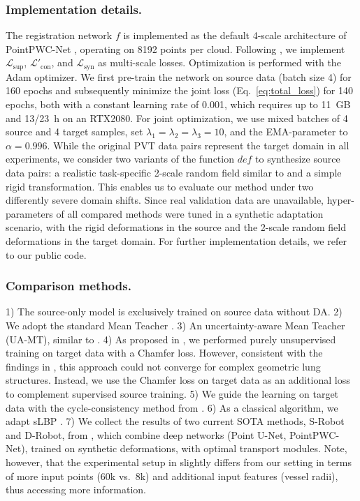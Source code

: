 \documentclass[runningheads]{llncs}
\begin{document}
\subsubsection{Implementation details.}
The registration network $f$ is implemented as the default 4-scale architecture of PointPWC-Net \cite{wu2020pointpwc}, operating on 8192 points per cloud.
Following \cite{wu2020pointpwc}, we implement $\mathcal{L}_{\mathrm{sup}}$, $\mathcal{L}'_{\mathrm{con}}$, and $\mathcal{L}_{\mathrm{syn}}$ as multi-scale losses.
Optimization is performed with the Adam optimizer.
We first pre-train the network on source data (batch size 4) for 160 epochs and subsequently minimize the joint loss (Eq.~\ref{eq:total_loss}) for 140 epochs, both with a constant learning rate of 0.001, which requires up to \SI{11}{GB} and 13/\SI{23}{h} on an RTX2080.
For joint optimization, we use mixed batches of 4 source and 4 target samples, set $\lambda_1=\lambda_2=\lambda_3=10$, and the EMA-parameter to $\alpha=0.996$.
While the original PVT data pairs represent the target domain in all experiments, we consider two variants of the function $def$ to synthesize source data pairs: a realistic task-specific 2-scale random field similar to \cite{shen2021accurate} and a simple rigid transformation.
This enables us to evaluate our method under two differently severe domain shifts.
Since real validation data are unavailable, hyper-parameters of all compared methods were tuned in a synthetic adaptation scenario, with the rigid deformations in the source and the 2-scale random field deformations in the target domain.
For further implementation details, we refer to our public code.


\subsubsection{Comparison methods.}
\label{sec:comparison_methods}
1) The source-only model is exclusively trained on source data without DA.
2) We adopt the standard Mean Teacher \cite{bigalke2022adapting}.
3) An uncertainty-aware Mean Teacher (UA-MT), similar to \cite{xu2022double,yu2019uncertainty}.
4) As proposed in \cite{wu2020pointpwc}, we performed purely unsupervised training on target data with a Chamfer loss. 
However, consistent with the findings in \cite{shen2021accurate}, this approach could not converge for complex geometric lung structures.
Instead, we use the Chamfer loss on target data as an additional loss to complement supervised source training.
5) We guide the learning on target data with the cycle-consistency method from \cite{mittal2020just}.
6) As a classical algorithm, we adapt sLBP \cite{hansen2021deep}.
7) We collect the results of two current SOTA methods, S-Robot and D-Robot, from \cite{shen2021accurate}, which combine deep networks (Point U-Net, PointPWC-Net), trained on synthetic deformations, with optimal transport modules.
Note, however, that the experimental setup in \cite{shen2021accurate} slightly differs from our setting in terms of more input points (60k vs.~8k) and additional input features (vessel radii), thus accessing more information.
\end{document}
